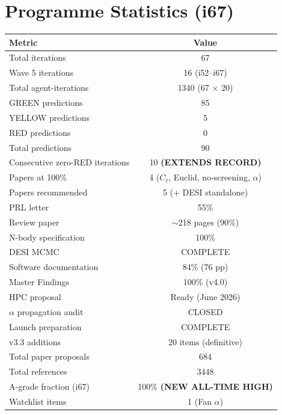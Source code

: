 \documentclass[11pt,a4paper]{article}
\begin{document}
\section{Programme Statistics (i67)}
\label{sec:stats}

\begin{center}
\begin{tabular}{lc}
\toprule
\textbf{Metric} & \textbf{Value} \\
\midrule
Total iterations & 67 \\
Wave 5 iterations & 16 (i52--i67) \\
Total agent-iterations & 1340 (67 $\times$ 20) \\
GREEN predictions & 85 \\
YELLOW predictions & 5 \\
RED predictions & 0 \\
Total predictions & 90 \\
Consecutive zero-RED iterations & 10 \textbf{(EXTENDS RECORD)} \\
Papers at 100\% & 4 ($C_\ell$, Euclid, no-screening, $\alpha$) \\
Papers recommended & 5 (+ DESI standalone) \\
PRL letter & 55\% \\
Review paper & $\sim$218 pages (90\%) \\
N-body specification & 100\% \\
DESI MCMC & COMPLETE \\
Software documentation & 84\% (76 pp) \\
Master Findings & 100\% (v4.0) \\
HPC proposal & Ready (June 2026) \\
$\alpha$ propagation audit & CLOSED \\
Launch preparation & COMPLETE \\
v3.3 additions & 20 items (definitive) \\
Total paper proposals & 684 \\
Total references & 3448 \\
A-grade fraction (i67) & 100\% \textbf{(NEW ALL-TIME HIGH)} \\
Watchlist items & 1 (Fan $\alpha$) \\
\bottomrule
\end{tabular}
\end{center}
\end{document}
